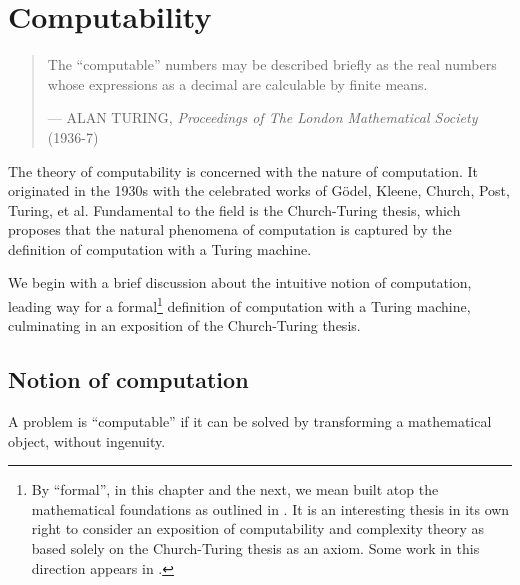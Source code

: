 \chapter{Computability} \label{sec:background-computability}

\begin{quotation}

\footnotesize\sffamily\itshape

\begin{flushright}

The ``computable'' numbers may be described briefly as the real numbers whose
expressions as a decimal are calculable by finite means.

\smallbreak

\upshape

--- ALAN TURING, {\itshape Proceedings of The London Mathematical Society} (1936-7)

\end{flushright}

\end{quotation}

The theory of computability is concerned with the nature of computation. It
originated in the 1930s with the celebrated works of G\"odel, Kleene, Church,
Post, Turing, et al.  Fundamental to the field is the Church-Turing thesis,
which proposes that the natural phenomena of computation is captured by the
definition of computation with a Turing machine.

We begin with a brief discussion about the intuitive notion of computation,
leading way for a formal\footnote{By ``formal'', in this chapter and the next,
we mean built atop the mathematical foundations as outlined in
. It is an interesting thesis in
its own right to consider an exposition of computability and complexity theory
as based solely on the Church-Turing thesis as an axiom. Some work in this
direction appears in \cite{markov-1954}.} definition of computation with a
Turing machine, culminating in an exposition of the Church-Turing thesis.

\section{Notion of computation}

\begin{notion} A problem is ``computable'' if it can be solved by transforming
a mathematical object, without ingenuity. \end{notion}

